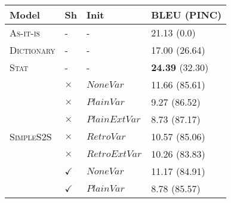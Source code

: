 \begin{table}
\centering
\scriptsize
\addtolength{\tabcolsep}{-2pt}
\begin{tabular}{|l|l|l|l| }
\hline 
Model & Sh  & Init  & BLEU (PINC) \\ \hline \hline
\textsc{As-it-is}  & {-} & {-}  &  {21.13} (0.0)  \\ \hline
\textsc{Dictionary}  & {-} & {-}  &  {17.00} (26.64)  \\ \hline
\textsc{Stat}   & {-} & {-}  &  \textbf{24.39} (32.30)    \\ \hline
\multirow{10}{*}{\textsc{SimpleS2S}} &  $\times$ & $NoneVar$ & 11.66 (85.61) \\
&  $\times$ & $PlainVar$ & 9.27 (86.52) \\
 & $\times$ & $PlainExtVar$  & 8.73 (87.17) \\ 
 & $\times$ & $RetroVar$ &  10.57 (85.06) \\ 
& $\times$ & $RetroExtVar$  & 10.26 (83.83) \\ 
& $\checkmark$ & $NoneVar$ &  11.17 (84.91) \\
 & $\checkmark$ & $PlainVar$ &  8.78 (85.57) \\

\end{tabular}
\end{table}
